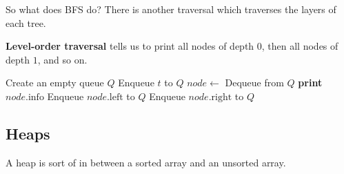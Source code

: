   So what does BFS do? There is another traversal which traverses the layers of each tree. 

  \begin{algo}
    \textbf{Level-order traversal} tells us to print all nodes of depth $0$, then all nodes of depth $1$, and so on.
    \begin{algorithmic}[1]
        \State Create an empty queue $Q$
        \State Enqueue $t$ to $Q$
          \State $node \gets$ Dequeue from $Q$
          \State \textbf{print} $node.\text{info}$
            \State Enqueue $node.\text{left}$ to $Q$
          \EndIf
            \State Enqueue $node.\text{right}$ to $Q$
          \EndIf
        \EndWhile
      \EndIf
    \EndProcedure
    \end{algorithmic}
  \end{algo}

\subsection{Heaps}

  A heap is sort of in between a sorted array and an unsorted array. 

